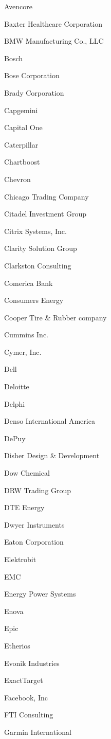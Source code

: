 \documentclass[twoside]{article}
\begin{document}
\begin{center}
\begin{multicols}{5}
\begin{FlushLeft}
\begin{compactitem}
\item Avencore
\item Baxter Healthcare Corporation
\item BMW Manufacturing Co., LLC
\item Bosch
\item Bose Corporation
\item Brady Corporation
\item Capgemini
\item Capital One
\item Caterpillar
\item Chartboost
\item Chevron
\item Chicago Trading Company
\item Citadel Investment Group
\item Citrix Systems, Inc.
\item Clarity Solution Group
\item Clarkston Consulting
\item Comerica Bank
\item Consumers Energy
\item Cooper Tire \& Rubber company
\item Cummins Inc.
\item Cymer, Inc.
\item Dell
\item Deloitte
\item Delphi
\item Denso International America
\item DePuy
\item Disher Design \& Development
\item Dow Chemical
\item DRW Trading Group
\item DTE Energy
\item Dwyer Instruments
\item Eaton Corporation
\item Elektrobit
\item EMC
\item Energy Power Systems
\item Enova
\item Epic
\item Etherios
\item Evonik Industries
\item ExactTarget
\item Facebook, Inc
\item FTI Consulting
\item Garmin International

\end{compactitem}
\end{FlushLeft}
\end{multicols}
\end{center}
\end{document}
